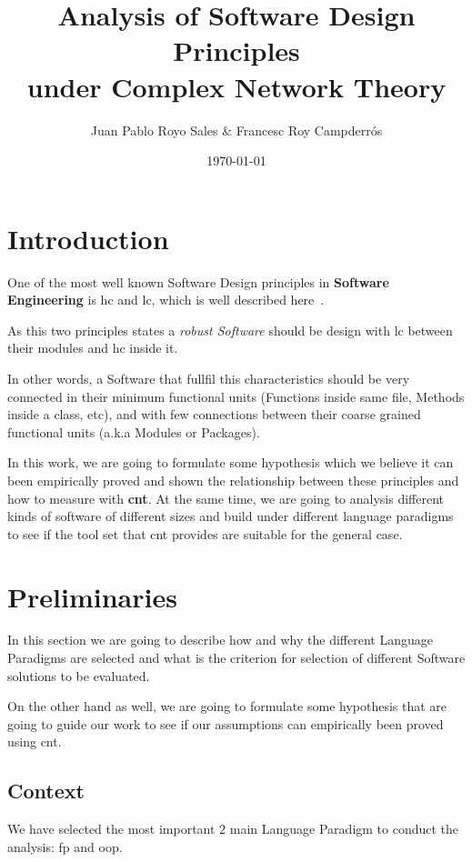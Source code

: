 \documentclass[12pt, a4paper]{article}
\title{%
      Analysis of Software Design Principles \\
      under Complex Network Theory\\
}
\author{Juan Pablo Royo Sales \& Francesc Roy Campderrós}
\affil{Universitat Politècnica de Catalunya}
\date\today
\begin{document}
\maketitle

\tableofcontents

\section{Introduction}
One of the most well known Software Design principles in \textbf{Software Engineering} is \acrfull{hc} and \acrfull{lc}, which is well described here~\cite{cohesion_coupling}.

As this two principles states a \textit{robust Software} should be design with \acrlong{lc} between their modules and \acrlong{hc} inside it. 

In other words, a Software that fullfil this characteristics should be very connected in their minimum functional units (Functions inside same file, Methods inside a class, etc), and with few connections between their coarse grained functional units (a.k.a Modules or Packages).

In this work, we are going to formulate some hypothesis which we believe it can been empirically proved and shown the relationship between these principles and how to measure with \textbf{\acrfull{cnt}}.
At the same time, we are going to analysis different kinds of software of different sizes and build under different language paradigms to see if the tool set that \acrshort{cnt} provides are suitable for the general case. 

\section{Preliminaries}
In this section we are going to describe how and why the different Language Paradigms are selected and what is the criterion for selection of different Software solutions to be evaluated.

On the other hand as well, we are going to formulate some hypothesis that are going to guide our work to see if our assumptions can empirically been proved using \acrlong{cnt}.

\subsection{Context}
We have selected the most important $2$ main Language Paradigm to conduct the analysis: \acrfull{fp} and \acrfull{oop}. 
\end{document}
